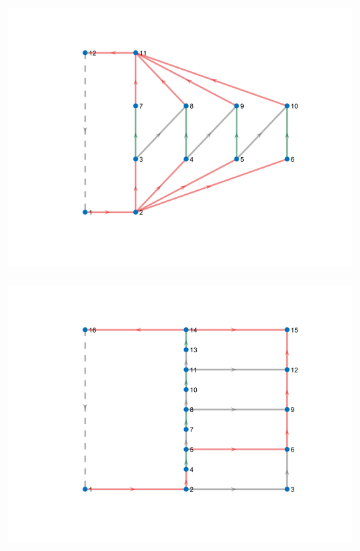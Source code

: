 \documentclass{article}
\begin{document}
\begin{figure}[htbp]
    \centering
    \begin{subfigure}[b]{0.3\textwidth}
        \includegraphics[width=\textwidth]{../attachments/f-dege-mac-4.png}
        \caption{}
        \label{fig:d-structure-f4}
    \end{subfigure}
    \hspace{0.05\textwidth}
    \begin{subfigure}[b]{0.3\textwidth}
        \includegraphics[width=\textwidth]{../attachments/e-dege-mac-4.png}
        \caption{}
        \label{fig:d-structure-e4}
    \end{subfigure}
    \hspace{0.05\textwidth}

\end{figure}
\end{document}
